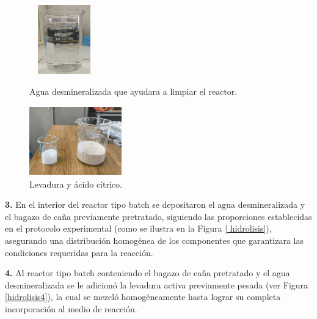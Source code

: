 \documentclass[12pt]{article}
\begin{document}
		 \begin{figure}[H]
		 	\centering
		 	\begin{minipage}{0.46\textwidth}
		 		\centering
		 		\includegraphics[width=3cm, height=3cm]{imagenes/agua} %
		 		\caption{ Agua desmineralizada que ayudara a limpiar el reactor.}
		 		\label{agua}
		 	\end{minipage}
		 	\hfill
		 	\begin{minipage}{0.48\textwidth}
		 		\centering
		 		\includegraphics[width=4cm, height=3cm]{imagenes/levadura y acido citrico} %
		 		\caption{Levadura y ácido cítrico.}
		 		\label{pesado2}
		 	\end{minipage}
		 \end{figure}
		 
		 
	     \textbf{3.} En el interior del reactor tipo batch se depositaron el agua desmineralizada y el bagazo de caña previamente pretratado, siguiendo las proporciones establecidas en el protocolo experimental (como se ilustra en la Figura \ref{ hidrolisis}), asegurando una distribución homogénea de los componentes que garantizara las condiciones requeridas para la reacción.
	     	
	     \textbf{4.} Al reactor tipo batch conteniendo el bagazo de caña pretratado y el agua desmineralizada se le adicionó la levadura activa previamente pesada (ver Figura \ref{hidrolisis4}), la cual se mezcló homogéneamente hasta lograr su completa incorporación al medio de reacción. 
	     
	    
	     
\end{document}
